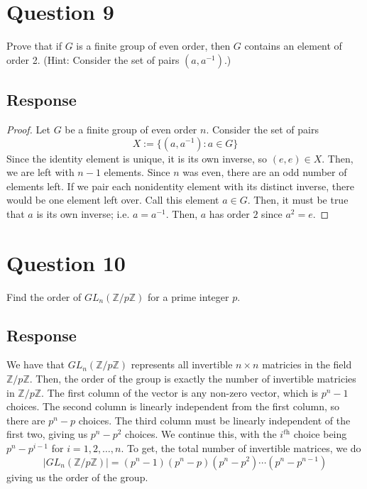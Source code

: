 \documentclass[13pt]{article}
\begin{document}
\newpage
\section*{Question 9}
Prove that if $G$ is a finite group of even order, then $G$ contains an element of order 2. (Hint:
Consider the set of pairs $(a, a^{-1})$.)

\subsection*{Response}
\begin{proof}
    Let $G$ be a finite group of even order $n$. Consider the set of pairs 
    \[X := \{ (a, a^{-1}) : a \in G \}\]
    Since the identity element is unique, it is its own inverse, so $(e, e) \in X$. Then, 
    we are left with $n - 1$ elements. Since $n$ was even, there are an odd number of elements left. 
    If we pair each nonidentity element with its distinct inverse, there would be one element left 
    over. Call this element $a \in G$. Then, it must be true that $a$ is its own inverse; i.e. 
    $a = a^{-1}$. Then, $a$ has order $2$ since $a^2 = e$.
\end{proof}




\newpage
\section*{Question 10}
Find the order of $GL_n(\mathbb{Z}/p\mathbb{Z})$ for a prime integer $p$.

\subsection*{Response}
We have that $GL_n(\mathbb{Z}/p\mathbb{Z})$ represents all invertible $n \times n$ matricies in the 
field $\mathbb{Z}/p\mathbb{Z}$. Then, the order of the group is exactly the number of invertible matricies
in $\mathbb{Z}/p\mathbb{Z}$. The first column of the vector is any non-zero vector, which is $p^n - 1$
choices. The second column is linearly independent from the first column, so there are $p^n - p$ choices.
The third column must be linearly independent of the first two, giving us $p^n - p^2$ choices. We continue
this, with the $i^{\textit{th}}$ choice being $p^n - p^{i - 1}$ for $i = 1, 2, \ldots, n$. To get,
the total number of invertible matrices, we do
\[\left| GL_n(\mathbb{Z}/p\mathbb{Z}) \right| = (p^n - 1)(p^n - p)(p^n - p^2) \cdots (p^n - p^{n - 1})\]
giving us the order of the group.
\end{document}
